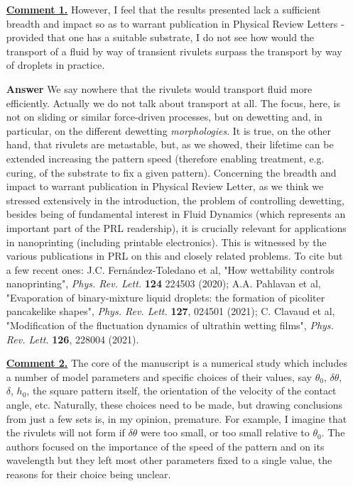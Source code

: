 \documentclass[12pt,english]{article}
\begin{document}
\begin{itemize}

\item[ \textbf{\underline{Comment 1.}}]
{ 
However, I feel that the
results presented lack a sufficient breadth and impact so as to
warrant publication in Physical Review Letters - provided that one has
a suitable substrate, I do not see how would the transport of a fluid
by way of transient rivulets surpass the transport by way of droplets
in practice.
}

\item[ \textbf{{Answer}}]
{ 
We say nowhere that the rivulets would transport fluid more efficiently. Actually 
we do not talk about transport at all. The focus, here, is not on sliding or similar force-driven processes, but 
on dewetting and, in particular, on the different dewetting {\it morphologies}. 
It is true, on the other hand, that rivulets are metastable, but, as 
we showed, their lifetime can be extended increasing the pattern speed
(therefore enabling treatment, e.g. curing, of the substrate to 
fix a given pattern).
Concerning the breadth and impact to warrant publication in Physical Review Letter, as we think we stressed extensively in the introduction,
the problem of controlling dewetting, besides being of fundamental interest in Fluid Dynamics (which represents an important part of the 
PRL readership), it is crucially relevant for applications in 
nanoprinting (including printable electronics). 
This is witnessed by the various publications in PRL on this and closely related problems. To cite but a few recent ones: J.C. Fern\'andez-Toledano et al, "How wettability controls nanoprinting",
{\it Phys. Rev. Lett.} {\bf 124} 224503 (2020); A.A. Pahlavan et al,
"Evaporation of binary-mixture liquid droplets: the formation of picoliter pancakelike shapes", {\it Phys. Rev. Lett.} {\bf 127}, 024501 (2021); C. Clavaud et al, "Modification of the fluctuation dynamics of ultrathin wetting films", {\it Phys. Rev. Lett.} {\bf 126}, 228004 (2021).
}


\item[ \textbf{\underline{Comment 2.}}]
{ 
The core of the manuscript is a numerical study which includes a
number of model parameters and specific choices of their values, say
$\theta_0$, $ \delta \theta$, $\delta$, $h_0$, 
the square pattern itself, the
orientation of the velocity of the contact angle, etc. Naturally,
these choices need to be made, but drawing conclusions from just a few
sets is, in my opinion, premature.
For example, I imagine that the rivulets will not form if $\delta\theta$ were too small, or too small relative to $\theta_0$. 
The authors focused on the importance of the speed of the pattern and on its wavelength but they left most other parameters fixed to a single value, the reasons for their choice being unclear.
}


\end{itemize}
\end{document}
